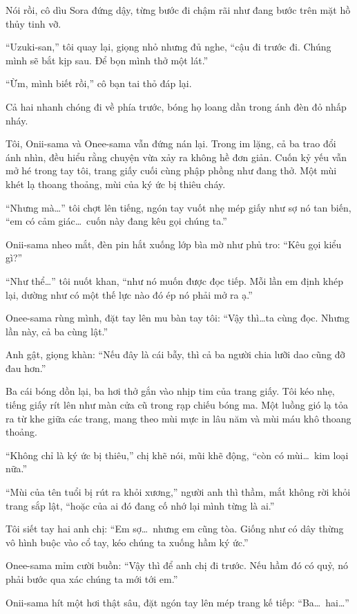 \documentclass[../main.tex]{subfiles}
\begin{document}
Nói rồi, cô dìu Sora đứng dậy, từng bước đi chậm rãi như đang bước trên mặt hồ thủy tinh vỡ.

``Uzuki-san,'' tôi quay lại, giọng nhỏ nhưng đủ nghe, ``cậu đi trước đi. Chúng mình sẽ bắt kịp sau. Để bọn mình thở một lát.''

``Ừm, mình biết rồi,'' cô bạn tai thỏ đáp lại.

Cả hai nhanh chóng đi về phía trước, bóng họ loang dần trong ánh đèn đỏ nhấp nháy.

Tôi, Onii-sama và Onee-sama vẫn đứng nán lại. Trong im lặng, cả ba trao đổi ánh nhìn, đều hiểu rằng chuyện vừa xảy ra không hề đơn giản. Cuốn kỷ yếu vẫn mở hé trong tay tôi, trang giấy cuối cùng phập phồng như đang thở. Một mùi khét lạ thoang thoảng, mùi của ký ức bị thiêu cháy.

``Nhưng mà\dots'' tôi chợt lên tiếng, ngón tay vuốt nhẹ mép giấy như sợ nó tan biến, ``em có cảm giác\dots\ cuốn này đang kêu gọi chúng ta.''

Onii-sama nheo mắt, đèn pin hắt xuống lớp bìa mờ như phủ tro: ``Kêu gọi kiểu gì?''

``Như thể\dots'' tôi nuốt khan, ``như nó muốn được đọc tiếp. Mỗi lần em định khép lại, dường như có một thế lực nào đó ép nó phải mở ra ạ.''

Onee-sama rùng mình, đặt tay lên mu bàn tay tôi: ``Vậy thì\dots ta cùng đọc. Nhưng lần này, cả ba cùng lật.''

Anh gật, giọng khàn: ``Nếu đây là cái bẫy, thì cả ba người chia lưỡi dao cũng đỡ đau hơn.''

Ba cái bóng dồn lại, ba hơi thở gắn vào nhịp tim của trang giấy. Tôi kéo nhẹ, tiếng giấy rít lên như màn cửa cũ trong rạp chiếu bóng ma. Một luồng gió lạ tỏa ra từ khe giữa các trang, mang theo mùi mực in lâu năm và mùi máu khô thoang thoảng.

``Không chỉ là ký ức bị thiêu,'' chị khẽ nói, mũi khẽ động, ``còn có mùi\dots\ kim loại nữa.''

``Mùi của tên tuổi bị rút ra khỏi xương,'' người anh thì thầm, mắt không rời khỏi trang sắp lật, ``hoặc của ai đó đang cố nhớ lại mình từng là ai.''

Tôi siết tay hai anh chị: ``Em sợ\dots\ nhưng em cũng tòa. Giống như có dây thừng vô hình buộc vào cổ tay, kéo chúng ta xuống hầm ký ức.''

Onee-sama mỉm cười buồn: ``Vậy thì để anh chị đi trước. Nếu hầm đó có quỷ, nó phải bước qua xác chúng ta mới tới em.''

Onii-sama hít một hơi thật sâu, đặt ngón tay lên mép trang kế tiếp: ``Ba\dots\ hai\dots''
\end{document}
